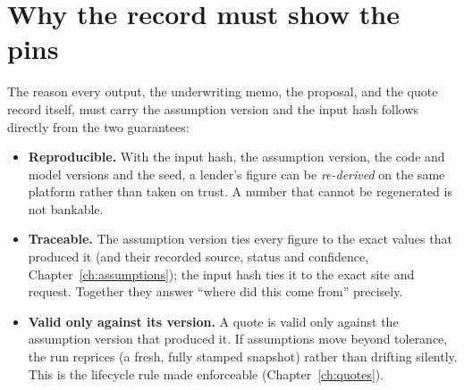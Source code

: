 \section{Why the record must show the pins}

The reason every output, the underwriting memo, the proposal, and the quote record itself, must carry the assumption version and the input hash follows directly from the two guarantees:

\begin{itemize}
  \item \textbf{Reproducible.} With the input hash, the assumption version, the code and model versions and the seed, a lender's figure can be \emph{re-derived} on the same platform rather than taken on trust. A number that cannot be regenerated is not bankable.
  \item \textbf{Traceable.} The assumption version ties every figure to the exact values that produced it (and their recorded source, status and confidence, Chapter~\ref{ch:assumptions}); the input hash ties it to the exact site and request. Together they answer ``where did this come from'' precisely.
  \item \textbf{Valid only against its version.} A quote is valid only against the assumption version that produced it. If assumptions move beyond tolerance, the run reprices (a fresh, fully stamped snapshot) rather than drifting silently. This is the lifecycle rule made enforceable (Chapter~\ref{ch:quotes}).
\end{itemize}

